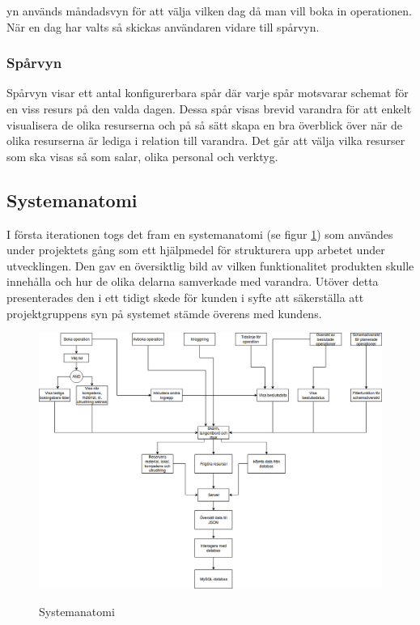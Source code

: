 yn används måndadsvyn för att välja vilken dag då man vill boka in operationen. När en dag har valts så skickas användaren vidare till spårvyn.

\subsubsection{Spårvyn}
Spårvyn visar ett antal konfigurerbara spår där varje spår motsvarar schemat för en viss resurs på den valda dagen. Dessa spår visas brevid varandra för att enkelt visualisera de olika resurserna och på så sätt skapa en bra överblick över när de olika resurserna är lediga i relation till varandra. Det går att välja vilka resurser som ska visas så som salar, olika personal och verktyg. 



\subsection{Systemanatomi}
I första iterationen togs det fram en systemanatomi (se figur \ref{fig:Systemanatomi}) som användes under projektets gång som ett hjälpmedel för strukturera upp arbetet under utvecklingen. Den gav en översiktlig bild av vilken funktionalitet produkten skulle innehålla och hur de olika delarna samverkade med varandra. Utöver detta presenterades den i ett tidigt skede för kunden i syfte att säkerställa att projektgruppens syn på systemet stämde överens med kundens.

\begin{figure}[H]
    \includegraphics[width=\textwidth,height=.4\textheight]{Figures/Systemanatomi.png}\\
    \caption{Systemanatomi}
    \label{fig:Systemanatomi}
\end{figure}

